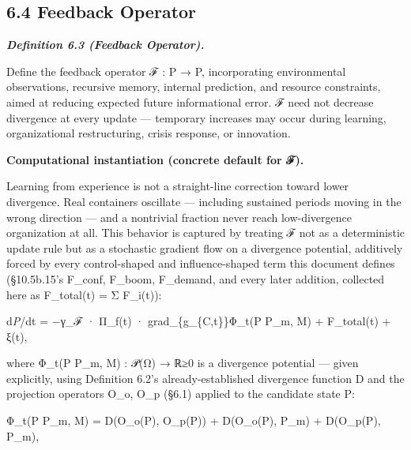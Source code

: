 \documentclass[
]{article}
\begin{document}
\hypertarget{feedback-operator}{%
\subsection{6.4 Feedback Operator}\label{feedback-operator}}

\emph{\textbf{Definition 6.3 (Feedback Operator).}}

Define the feedback operator ℱ : P → P, incorporating environmental
observations, recursive memory, internal prediction, and resource
constraints, aimed at reducing expected future informational error. ℱ
need not decrease divergence at every update --- temporary increases may
occur during learning, organizational restructuring, crisis response, or
innovation.

\textbf{Computational instantiation (concrete default for ℱ).}

Learning from experience is not a straight-line correction toward lower
divergence. Real containers oscillate --- including sustained periods
moving in the wrong direction --- and a nontrivial fraction never reach
low-divergence organization at all. This behavior is captured by
treating ℱ not as a deterministic update rule but as a stochastic
gradient flow on a divergence potential, additively forced by every
control-shaped and influence-shaped term this document defines
(§10.5b.15's F\_conf, F\_boom, F\_demand, and every later addition,
collected here as F\_total(t) = Σ F\_i(t)):

d\emph{P}/dt = −γ\_ℱ · Π\_f(t) · grad\_\{g\_\{C,t\}\}Φ\_t(P P\_m, M) +
F\_total(t) + ξ(t),

where Φ\_t(P P\_m, M) : 𝒫(Ω) → ℝ≥0 is a divergence potential --- given
explicitly, using Definition 6.2's already-established divergence
function D and the projection operators O\_o, O\_p (§6.1) applied to the
candidate state P:

Φ\_t(P P\_m, M) = D(O\_o(P), O\_p(P)) + D(O\_o(P), P\_m) + D(O\_p(P),
P\_m),
\end{document}
